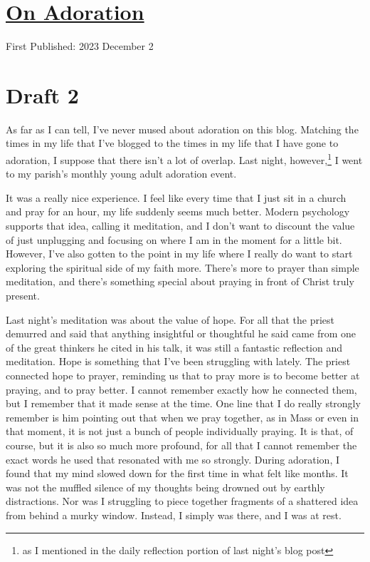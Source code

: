 \documentclass[12pt]{article}[titlepage]
\newcommand{\1}{\={a}}
\newcommand{\2}{\={e}}
\newcommand{\3}{\={\i}}
\newcommand{\4}{\=o}
\newcommand{\5}{\=u}
\newcommand{\6}{\={A}}
\renewcommand{\,}{\textsuperscript{,}}
\begin{document}
\doublespacing
\section{\href{adoration.html}{On Adoration}}
First Published: 2023 December 2

\section{Draft 2}
As far as I can tell, I've never mused about adoration on this blog.
Matching the times in my life that I've blogged to the times in my life that I have gone to adoration, I suppose that there isn't a lot of overlap.
Last night, however,\footnote{as I mentioned in the daily reflection portion of last night's blog post} I went to my parish's monthly young adult adoration event.
 
It was a really nice experience.
I feel like every time that I just sit in a church and pray for an hour, my life suddenly seems much better.
Modern psychology supports that idea, calling it meditation, and I don't want to discount the value of just unplugging and focusing on where I am in the moment for a little bit.
However, I've also gotten to the point in my life where I really do want to start exploring the spiritual side of my faith more.
There's more to prayer than simple meditation, and there's something special about praying in front of Christ truly present.
 
Last night's meditation was about the value of hope.
For all that the priest demurred and said that anything insightful or thoughtful he said came from one of the great thinkers he cited in his talk, it was still a fantastic reflection and meditation.
Hope is something that I've been struggling with lately.
The priest connected hope to prayer, reminding us that to pray more is to become better at praying, and to pray better.
I cannot remember exactly how he connected them, but I remember that it made sense at the time.
One line that I do really strongly remember is him pointing out that when we pray together, as in Mass or even in that moment, it is not just a bunch of people individually praying.
It is that, of course, but it is also so much more profound, for all that I cannot remember the exact words he used that resonated with me so strongly.
 During adoration, I found that my mind slowed down for the first time in what felt like months.
It was not the muffled silence of my thoughts being drowned out by earthly distractions.
Nor was I struggling to piece together fragments of a shattered idea from behind a murky window.
Instead, I simply was there, and I was at rest.
 
\end{document}
